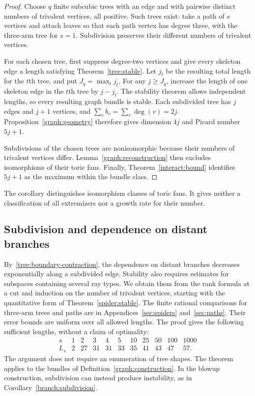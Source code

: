 \begin{proof}
Choose $q$ finite subcubic trees with an edge and with pairwise distinct
numbers of trivalent vertices, all positive. Such trees exist: take a
path of $s$ vertices and attach leaves so that each path vertex has
degree three, with the three-arm tree for $s=1$. Subdivision preserves
their different numbers of trivalent vertices.

For each chosen tree, first suppress degree-two vertices and give every
skeleton edge a length satisfying Theorem~\ref{tree:stable}. Let $j_t$
be the resulting total length for the $t$th tree, and put
$J_q=\max_t j_t$. For any $j\ge J_q$, increase the length of one
skeleton edge in the $t$th tree by $j-j_t$. The stability theorem
allows independent lengths, so every resulting graph bundle is stable.
Each subdivided tree has $j$ edges and $j+1$ vertices, and
$\sum_v b_v=\sum_v\deg(v)=2j$. Proposition~\ref{graph:geometry}
therefore gives dimension $4j$ and Picard number $5j+1$.

Subdivisions of the chosen trees are nonisomorphic because their
numbers of trivalent vertices differ. Lemma~\ref{graph:reconstruction}
then excludes isomorphisms of their toric fans. Finally,
Theorem~\ref{interact:bound} identifies $5j+1$ as the maximum within
the bundle class.
\end{proof}

The corollary distinguishes isomorphism classes of toric fans. It gives
neither a classification of all extremizers nor a growth rate for their
number.

\subsection{Subdivision and dependence on distant branches}
By~\eqref{tree:boundary-contraction}, the dependence on distant
branches decreases exponentially along a subdivided edge. Stability
also requires estimates for subspaces containing several ray types.
We obtain them from the rank formula at a cut and induction on the
number of trivalent vertices, starting with the quantitative form of
Theorem~\ref{spider:stable}. The finite rational comparisons for
three-arm trees and paths are in
Appendices~\ref{sec:spiders} and~\ref{sec:paths}. Their error bounds
are uniform over all allowed lengths. The proof gives the following
sufficient lengths, without a claim of optimality:
\[
\begin{array}{c|rrrrrrrrrr}
s&1&2&3&4&5&10&25&50&100&1000\\ \hline
L_s&2&27&31&31&33&35&41&43&47&57.
\end{array}
\]
The argument does not require an enumeration of tree shapes. The
theorem applies to the bundles of Definition~\ref{graph:construction}.
In the blowup construction, subdivision can instead produce instability,
as in Corollary~\ref{branch:subdivision}.


